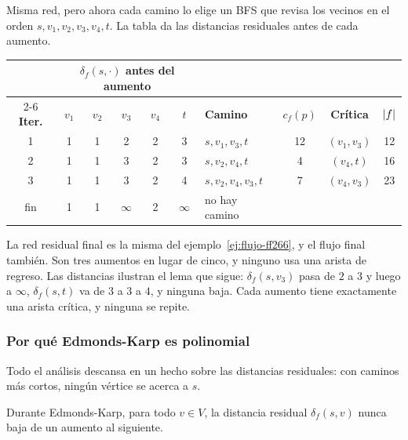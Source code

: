 \documentclass[11pt,letterpaper]{article}
\begin{document}
\begin{ejemplo}\label{ej:flujo-ek}
  Misma red, pero ahora cada camino lo elige un BFS que revisa los
  vecinos en el orden $s, v_1, v_2, v_3, v_4, t$. La tabla da las
  distancias residuales antes de cada aumento.
  \begin{center}
  \small
  \begin{tabular}{cccccclccc}
    \toprule
    & \multicolumn{5}{c}{$\delta_f(s, \cdot)$ antes del aumento}
    & & & & \\
    \cmidrule(lr){2-6}
    \textbf{Iter.} & $v_1$ & $v_2$ & $v_3$ & $v_4$ & $t$
    & \textbf{Camino} & $c_f(p)$ & \textbf{Crítica} & $\left\lvert f \right\rvert$ \\
    \midrule
    1 & 1 & 1 & 2 & 2 & 3 & $s, v_1, v_3, t$ & 12 & $(v_1, v_3)$
      & 12 \\
    2 & 1 & 1 & 3 & 2 & 3 & $s, v_2, v_4, t$ & 4 & $(v_4, t)$ & 16 \\
    3 & 1 & 1 & 3 & 2 & 4 & $s, v_2, v_4, v_3, t$ & 7 & $(v_4, v_3)$
      & 23 \\
    fin & 1 & 1 & $\infty$ & 2 & $\infty$ & no hay camino & & & \\
    \bottomrule
  \end{tabular}
  \end{center}
  La red residual final es la misma del ejemplo~\ref{ej:flujo-ff266},
  y el flujo final también. Son tres aumentos en lugar de cinco, y
  ninguno usa una arista de regreso. Las distancias ilustran el lema
  que sigue: $\delta_f(s, v_3)$ pasa de $2$ a $3$ y luego a $\infty$,
  $\delta_f(s, t)$ va de $3$ a $3$ a $4$, y ninguna baja. Cada aumento
  tiene exactamente una arista crítica, y ninguna se repite.
\end{ejemplo}

\subsubsection*{Por qué Edmonds-Karp es polinomial}

Todo el análisis descansa en un hecho sobre las distancias
residuales: con caminos más cortos, ningún vértice se acerca a $s$.

\begin{lema}\label{lem:flujo-distancias}
  Durante Edmonds-Karp, para todo $v \in V$, la distancia residual
  $\delta_f(s, v)$ nunca baja de un aumento al siguiente.
\end{lema}
\end{document}
